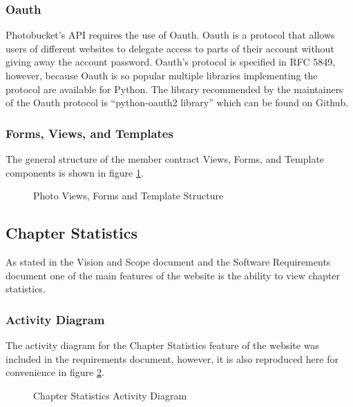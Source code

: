 \documentclass{article}
\begin{document}
\subsubsection{Oauth}

Photobucket's API requires the use of Oauth. Oauth is a protocol that allows users of different websites to delegate access
to parts of their account without giving away the account password. Oauth's protocol is specified in RFC 5849, however, because Oauth is so popular multiple libraries implementing the protocol are available for Python. \cite{eranhueniverse_oauth} The library recommended by the maintainers of the Oauth protocol is ``python-oauth2 library'' which can be found on Github. \cite{oauth_code} \cite{simplego_python-oauth2_2011}

\subsubsection{Forms, Views, and Templates}

The general structure of the member contract Views, Forms, and Template components is shown in figure \ref{fig:photoViewFormTemplateDiagram}.

\FloatBarrier
\begin{figure}[h!]
\centering
{}
\caption{Photo Views, Forms and Template Structure}
\label{fig:photoViewFormTemplateDiagram}
\end{figure}
\FloatBarrier

\subsection{Chapter Statistics}

As stated in the Vision and Scope document and the Software Requirements document one of the main features of the website is the ability to view chapter statistics.

\subsubsection{Activity Diagram}
The activity diagram for the Chapter Statistics feature of the website was included in the requirements document, however, it is also reproduced here for convenience in figure \ref{fig:chapterStatisticsActivityDiagram}.

\FloatBarrier
\begin{figure}[h!]
\centering
{}
\caption{Chapter Statistics Activity Diagram}
\label{fig:chapterStatisticsActivityDiagram}
\end{figure}
\FloatBarrier

\newpage


\end{document}
